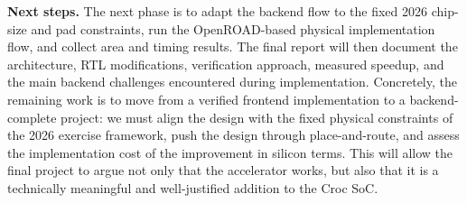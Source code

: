 \documentclass[10pt,a4paper]{article}
\begin{document}
\textbf{Next steps.}
The next phase is to adapt the backend flow to the fixed 2026 chip-size and pad
constraints, run the OpenROAD-based physical implementation flow, and collect
area and timing results. The final report will then document the architecture,
RTL modifications, verification approach, measured speedup, and the main backend
challenges encountered during implementation. Concretely, the remaining work is
to move from a verified frontend implementation to a backend-complete project:
we must align the design with the fixed physical constraints of the 2026
exercise framework, push the design through place-and-route, and assess the
implementation cost of the improvement in silicon terms. This will allow the
final project to argue not only that the accelerator works, but also that it is
a technically meaningful and well-justified addition to the Croc SoC.
\end{document}
